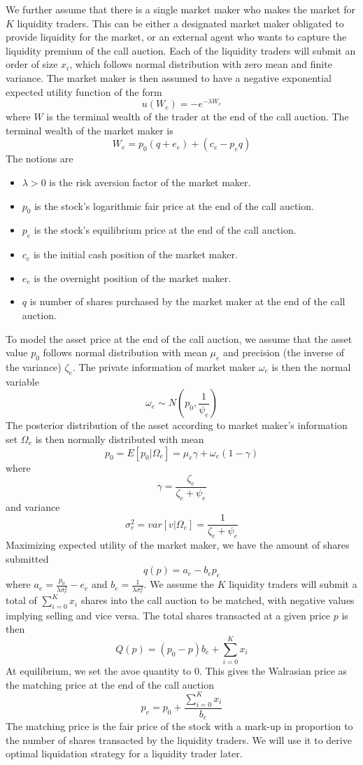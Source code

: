 \documentclass{article}
\begin{document}
We further assume that there is a single market maker who makes the market for $K$ liquidity traders. This can be either a designated market maker obligated to provide liquidity for the market, or an external agent who wants to capture the liquidity premium of the call auction. Each of the liquidity traders will submit an order of size $x_i$, which follows normal distribution with zero mean and finite variance. The market maker is then assumed to have a negative exponential expected utility function of the form
\[
  u(W_e) = -e^{-\lambda W_e}
\]
where $W$ is the terminal wealth of the trader at the end of the call auction. The terminal wealth of the market maker is
\[
  W_e = p_0 (q + e_e) + (c_e - p_e q)
\]
The notions are
\begin{itemize}
  \item $\lambda>0$ is the risk aversion factor of the market maker.
  \item $p_0$ is the stock's logarithmic fair price at the end of the call auction.
  \item $p_e$ is the stock's equilibrium price at the end of the call auction.
  \item $c_e$ is the initial cash position of the market maker.
  \item $e_e$ is the overnight position of the market maker.
  \item $q$ is number of shares purchased by the market maker at the end of the call auction.
\end{itemize}
To model the asset price at the end of the call auction, we assume that the asset value $p_0$ follows normal distribution with mean $\mu_e$ and precision (the inverse of the variance) $\zeta_e$. The private information of market maker $\omega_e$ is then the normal variable 
\[
\omega_e \sim N(p_0, \frac{1}{\psi_e})
\]
The posterior distribution of the asset according to market maker's information set $\Omega_e$ is then normally distributed with mean
\[
  p_0=E[p_0|\Omega_e]=\mu_e \gamma + \omega_e(1 - \gamma)
\]
where
\[
  \gamma = \frac{\zeta_e}{\zeta_e+\psi_e}
\]
and variance
\[
  \sigma_e^2=var[v|\Omega_e]=\frac{1}{\zeta_e+\psi_e}
\]
Maximizing expected utility of the market maker, we have the amount of shares submitted
\[
  q(p) = a_e - b_e p_e
\]
where $a_e = \frac{p_0}{\lambda \sigma_e^2} - e_e$ and $b_e=\frac{1}{\lambda \sigma_e^2}$. We assume the $K$ liquidity traders will submit a total of $\sum_{i=0}^K x_i$ shares into the call auction to be matched, with negative values implying selling and vice versa. The total shares transacted at a given price $p$ is then
\[
  Q(p) = (p_0 - p) b_e + \sum_{i=0}^K x_i
\]
At equilibrium, we set the avoe quantity to 0. This gives the Walrasian price as the matching price at the end of the call auction
\begin{equation}\label{markup_px_eqb}
  p_e = p_0 + \frac{\sum_{i=0}^K x_i}{b_e}
\end{equation}
The matching price is the fair price of the stock with a mark-up in proportion to the number of shares transacted by the liquidity traders. We will use it to derive optimal liquidation strategy for a liquidity trader later.
\end{document}
